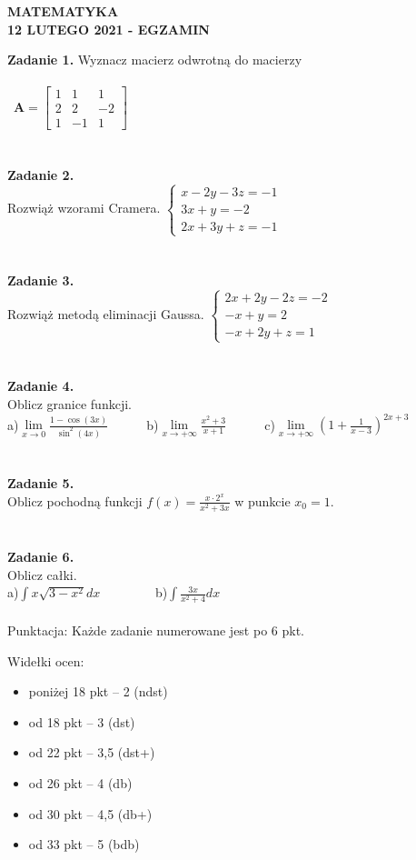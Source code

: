 \documentclass[12pt,a4paper]{report}
\begin{document}
\begin{center}

\textbf{MATEMATYKA \\12 LUTEGO 2021 - EGZAMIN}

\end{center}\textbf{Zadanie 1.} Wyznacz macierz odwrotną do macierzy \\\\\ $\mathbf{A} =\left[ \begin{array}{ccc}1 & 1& 1\\2& 2& -2\\1 & -1& 1\end{array} \right]$\\\\\\\textbf{Zadanie 2.}  \\Rozwiąż wzorami Cramera. $\left\{ \begin{array}{ll}x-2y-3z=-1\\ 3x+y=-2\\2x+3y+z=-1\end{array}\right.$\\\\\\\textbf{Zadanie 3.} \\Rozwiąż metodą eliminacji Gaussa. $\left\{ \begin{array}{ll}2x+2y-2z=-2\\ -x+y=2\\-x+2y+z=1\end{array} \right.$\\\\\\\textbf{Zadanie 4.} \\Oblicz granice funkcji.\\a)$\lim\limits_{x\to 0}\frac{1-\cos(3x)}{\sin^2(4x)}$\ \ \ \ \ \  b)$\lim\limits_{x\to +\infty}\frac{x^2+3}{x+1}$\ \ \ \ \ \ c)$\lim\limits_{x\to +\infty}\left( 1+\frac{1}{x-3}\right)^{2x+3}$\\\\\\\textbf{Zadanie 5.} \\ Oblicz pochodną funkcji $f(x)=\frac{x\cdot 2^x}{x^2+3x}$ w punkcie $x_0=1$.\\\\\\\textbf{Zadanie 6.} \\Oblicz całki. \\a)$\int x\sqrt{3-x^2} dx$ \ \ \ \ \ \ \ \ b)$\int \frac{3x}{x^2+4} dx$\\\\Punktacja: Każde zadanie numerowane jest po 6 pkt.



Widełki ocen:

\begin{itemize}

\item poniżej 18 pkt -- 2 (ndst)

\item od 18 pkt -- 3 (dst)

\item od 22 pkt -- 3,5 (dst+)

\item od 26 pkt -- 4 (db)

\item od 30 pkt -- 4,5 (db+)

\item od 33 pkt -- 5 (bdb)

\end{itemize}
\end{document}
